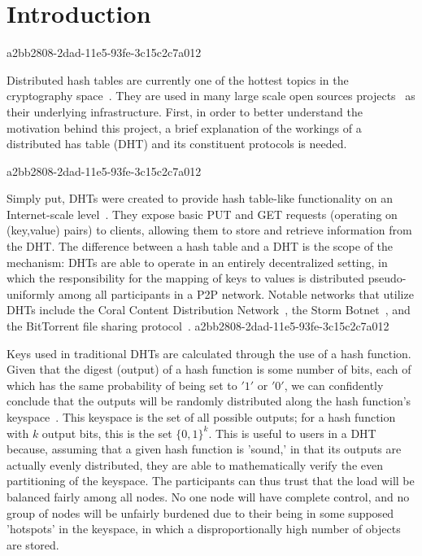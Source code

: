 \documentclass[12pt]{article}
\begin{document}
\section{Introduction}
a2bb2808-2dad-11e5-93fe-3c15c2c7a012\par Distributed hash tables are currently one of the hottest topics in the cryptography space~\cite{Stoica:2001dj,Rowstron:2001ea,Ratnasamy:2001wn}. They are used in many large scale open sources projects~\cite{Freitas:2013tb,Xu:2010vs,Perfitt:2010fh} as their underlying infrastructure. First, in order to better understand the motivation behind this project, a brief explanation of the workings of a distributed has table (DHT) and its constituent protocols is needed.

a2bb2808-2dad-11e5-93fe-3c15c2c7a012\par Simply put, DHTs were created to provide hash table-like functionality on an Internet-scale level~\cite{Ratnasamy:2001wn}. They expose basic PUT and GET requests (operating on (key,value) pairs) to clients, allowing them to store and retrieve information from the DHT. The difference between a hash table and a DHT is the scope of the mechanism: DHTs are able to operate in an entirely decentralized setting, in which the responsibility for the mapping of keys to values is distributed pseudo-uniformly among all participants in a P2P network. Notable networks that utilize DHTs include the Coral Content Distribution Network~\cite{Freedman:2004vb}, the Storm Botnet~\cite{Holz:2008uk}, and the BitTorrent file sharing protocol~\cite{Cohen:y1_8mBnw}.
a2bb2808-2dad-11e5-93fe-3c15c2c7a012
\par Keys used in traditional DHTs are calculated through the use of a hash function. Given that the digest (output) of a hash function is some number of bits, each of which has the same probability of being set to $'1'$ or $'0'$, we can confidently conclude that the outputs will be randomly distributed along the hash function's keyspace~. This keyspace is the set of all possible outputs; for a hash function with $k$ output bits, this is the set $\{0,1\}^k$. This is useful to users in a DHT because, assuming that a given hash function is 'sound,' in that its outputs are actually evenly distributed, they are able to mathematically verify the even partitioning of the keyspace. The participants can thus trust that the load will be balanced fairly among all nodes. No one node will have complete control, and no group of nodes will be unfairly burdened due to their being in some supposed 'hotspots' in the keyspace, in which a disproportionally high number of objects are stored.~
\end{document}
